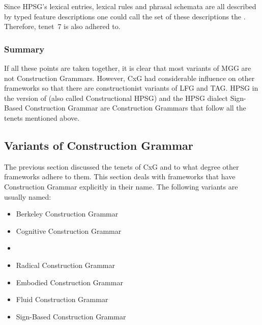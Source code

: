 \documentclass[output=paper]{langsci/langscibook}
\begin{document}
Since HPSG's lexical entries, lexical rules and phrasal schemata are all described by typed feature
descriptions one could call the set of these descriptions the . Therefore,
tenet~7 is also adhered to. 

\subsubsection{Summary}

If all these points are taken together, it is clear that most variants of MGG are not Construction
Grammars. However, CxG had considerable influence on other frameworks so that there are
constructionist variants of LFG and TAG. HPSG in the version of \citet{Sag97a} (also called
Constructional HPSG) and the HPSG dialect Sign-Based Construction Grammar are Construction Grammars
that follow all the tenets mentioned above.


\subsection{Variants of Construction Grammar}

The previous section discussed the tenets of CxG and to what degree other frameworks adhere to them. This
section deals with frameworks that have Construction Grammar explicitly in their name. The following
variants are usually named:
\begin{sloppypar}
\begin{itemize}
\item Berkeley Construction Grammar \citep{Fillmore88a,KF99a,FriedHSK}
\item Cognitive Construction Grammar \citep{Lakoff87a-u,Goldberg95a,Goldberg2006a}
\item {} \citep{Langacker87a-u,Langacker2000a,Langacker2008a-u,Dabrowska2004a}
\item Radical Construction Grammar \citep{Croft2001a}
\item Embodied Construction Grammar \citep{BC2005a}
\item Fluid Construction Grammar \citep{SDB2006a-u,SteelsFluid-ed-not-crossreferenced}
\item Sign-Based Construction Grammar \citep{Sag2010b,Sag2012a}
\end{itemize}
\end{sloppypar}
\end{document}
